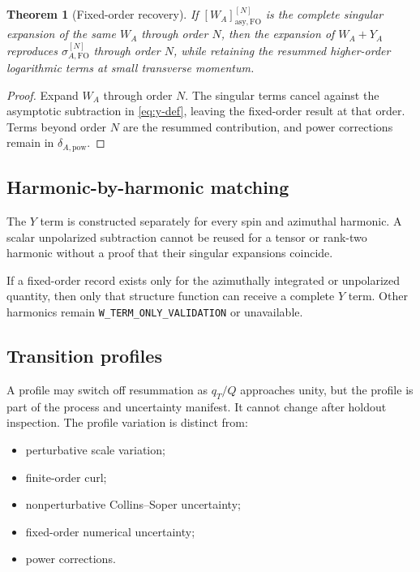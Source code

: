 \documentclass[11pt]{article}
\newtheorem{theorem}[definition]{Theorem}
\newcommand{\FO}{\mathrm{FO}}
\newcommand{\asy}{\mathrm{asy}}
\newcommand{\powc}{\mathrm{pow}}
\begin{document}
\begin{theorem}[Fixed-order recovery]
If \(\left[W_A\right]_{\asy,\FO}^{[N]}\) is the complete singular expansion of the same \(W_A\) through order \(N\), then the expansion of \(W_A+Y_A\) reproduces \(\sigma_{A,\FO}^{[N]}\) through order \(N\), while retaining the resummed higher-order logarithmic terms at small transverse momentum.
\end{theorem}

\begin{proof}
Expand \(W_A\) through order \(N\).  The singular terms cancel against the asymptotic subtraction in \cref{eq:y-def}, leaving the fixed-order result at that order.  Terms beyond order \(N\) are the resummed contribution, and power corrections remain in \(\delta_{A,\powc}\).
\end{proof}

\subsection{Harmonic-by-harmonic matching}

The \(Y\) term is constructed separately for every spin and azimuthal harmonic.  A scalar unpolarized subtraction cannot be reused for a tensor or rank-two harmonic without a proof that their singular expansions coincide.

If a fixed-order record exists only for the azimuthally integrated or unpolarized quantity, then only that structure function can receive a complete \(Y\) term.  Other harmonics remain \texttt{W\_TERM\_ONLY\_VALIDATION} or unavailable.

\subsection{Transition profiles}

A profile may switch off resummation as \(q_T/Q\) approaches unity, but the profile is part of the process and uncertainty manifest.  It cannot change after holdout inspection.  The profile variation is distinct from:
\begin{itemize}
\item perturbative scale variation;
\item finite-order curl;
\item nonperturbative Collins--Soper uncertainty;
\item fixed-order numerical uncertainty;
\item power corrections.
\end{itemize}
\end{document}
